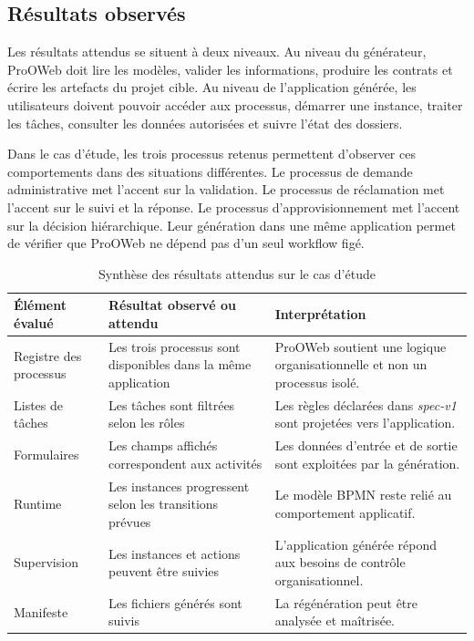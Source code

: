\subsection{Résultats observés}

Les résultats attendus se situent à deux niveaux. Au niveau du générateur, ProOWeb doit lire les modèles, valider les informations, produire les contrats et écrire les artefacts du projet cible. Au niveau de l'application générée, les utilisateurs doivent pouvoir accéder aux processus, démarrer une instance, traiter les tâches, consulter les données autorisées et suivre l'état des dossiers.

Dans le cas d'étude, les trois processus retenus permettent d'observer ces comportements dans des situations différentes. Le processus de demande administrative met l'accent sur la validation. Le processus de réclamation met l'accent sur le suivi et la réponse. Le processus d'approvisionnement met l'accent sur la décision hiérarchique. Leur génération dans une même application permet de vérifier que ProOWeb ne dépend pas d'un seul workflow figé.

\begin{table}[H]
\centering
\small
\caption{Synthèse des résultats attendus sur le cas d'étude}
\label{tab:chap4-resultats-attendus}
\begin{tabular}{p{4.0cm}p{4.8cm}p{4.8cm}}
\hline
\textbf{Élément évalué} & \textbf{Résultat observé ou attendu} & \textbf{Interprétation} \\
\hline
Registre des processus & Les trois processus sont disponibles dans la même application & ProOWeb soutient une logique organisationnelle et non un processus isolé. \\
Listes de tâches & Les tâches sont filtrées selon les rôles & Les règles déclarées dans \textit{spec-v1} sont projetées vers l'application. \\
Formulaires & Les champs affichés correspondent aux activités & Les données d'entrée et de sortie sont exploitées par la génération. \\
Runtime & Les instances progressent selon les transitions prévues & Le modèle BPMN reste relié au comportement applicatif. \\
Supervision & Les instances et actions peuvent être suivies & L'application générée répond aux besoins de contrôle organisationnel. \\
Manifeste & Les fichiers générés sont suivis & La régénération peut être analysée et maîtrisée. \\
\hline
\end{tabular}
\end{table}

